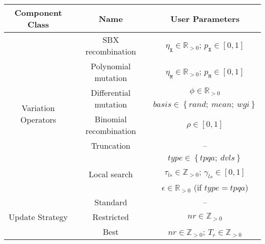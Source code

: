 
\renewcommand{\arraystretch}{1.4}

  \begin{tabular}{|c|c|c|}
    \hline
    \textbf{Component Class} & \textbf{Name} & \textbf{User Parameters} \\
    \hline
\multirow{9}{*}{Variation Operators}& 
SBX recombination & $\eta_{\mathtt{X}}\in\mathbb{R}_{>0}$; $p_{\mathtt{X}}\in\left[0,1\right]$ \\
	\cline{2-3}
	& Polynomial mutation & $\eta_{\mathtt{M}}\in\mathbb{R}_{>0}$; $p_{\mathtt{M}}\in\left[0,1\right]$\\
	\cline{2-3}
	& \multirow{2}{*}{Differential mutation}& $\phi\in\mathbb{R}_{>0}$ \\
	& & $basis \in\left\{rand;~mean;~wgi\right\}$\\
	\cline{2-3}
	& Binomial recombination&$\rho\in\left[0,1\right]$ \\
	\cline{2-3}
	& Truncation& --\\
	\cline{2-3}
	& \multirow{3}{*}{Local search} &$type \in\left\{tpqa;~dvls\right\}$ \\
	& & $\tau_{ls}\in\mathbb{Z}_{>0}$; $\gamma_{ls}\in\left[0,1\right]$ \\
	& & $\epsilon\in\mathbb{R}_{>0}$ (if $type = tpqa$) \\
    \hline
\multirow{3}{*}{Update Strategy}& 
	Standard & --\\
	\cline{2-3}
	& Restricted & $nr\in\mathbb{Z}_{>0}$\\
	\cline{2-3}
	& Best &$nr\in\mathbb{Z}_{>0}$; $T_r\in\mathbb{Z}_{>0}$ \\
    \hline
    \end{tabular} 
